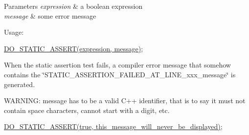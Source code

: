 \begin{DoxyParams}{Parameters}
{\em expression} & a boolean expression \\
\hline
{\em message} & some error message\\
\hline
\end{DoxyParams}
Usage\-:

\hyperlink{group___meta_ga2b69d33b4b707fde292f656c4e27b6a9}{D\-O\-\_\-\-S\-T\-A\-T\-I\-C\-\_\-\-A\-S\-S\-E\-R\-T(expression, message)};

When the static assertion test fails, a compiler error message that somehow contains the \char`\"{}\-S\-T\-A\-T\-I\-C\-\_\-\-A\-S\-S\-E\-R\-T\-I\-O\-N\-\_\-\-F\-A\-I\-L\-E\-D\-\_\-\-A\-T\-\_\-\-L\-I\-N\-E\-\_\-xxx\-\_\-message\char`\"{} is generated.

W\-A\-R\-N\-I\-N\-G\-: message has to be a valid C++ identifier, that is to say it must not contain space characters, cannot start with a digit, etc.

\hyperlink{group___meta_ga2b69d33b4b707fde292f656c4e27b6a9}{D\-O\-\_\-\-S\-T\-A\-T\-I\-C\-\_\-\-A\-S\-S\-E\-R\-T(true, this\-\_\-message\-\_\-will\-\_\-never\-\_\-be\-\_\-displayed)}; 
